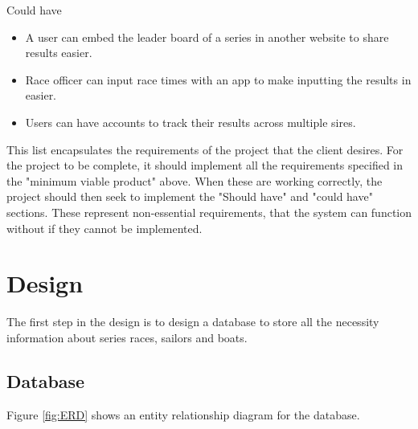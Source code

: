 \documentclass{l4proj}
\begin{document}
Could have
\begin{itemize}
    \item
    A user can embed the leader board of a series in another website to share results easier.
    \item
    Race officer can input race times with an app to make inputting the results in easier.
    \item
    Users can have accounts to track their results across multiple sires.
\end{itemize}

This list encapsulates the requirements of the project that the client desires. For the project to be complete, it should implement all the requirements specified in the "minimum viable product" above. When these are working correctly, the project should then seek to implement the "Should have" and "could have" sections. These represent non-essential requirements, that the system can function without if they cannot be implemented.

\chapter{Design}
The first step in the design is to design a database to store all the necessity information about series races, sailors and boats.
\section{Database}

Figure \ref{fig:ERD} shows an entity relationship diagram for the database. 
\end{document}
